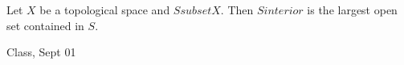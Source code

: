 \begin{samepage}
\begin{ex}
Let $X$ be a topological space and $S subset X$. Then $S interior$ is the largest open set contained in $S$.
\end{ex}
\begin{source}
Class, Sept 01
\end{source}
\end{samepage}
